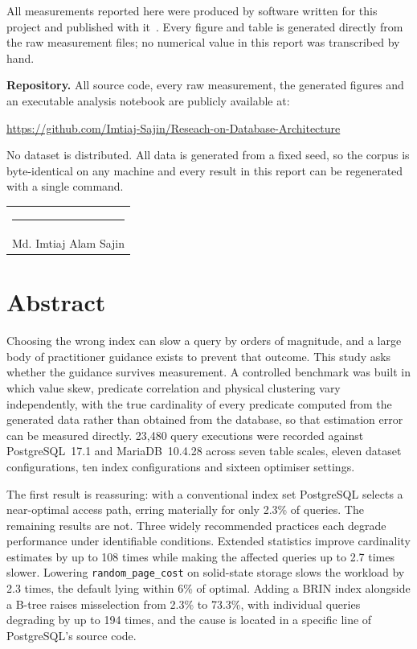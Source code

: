 \documentclass[12pt, a4paper]{article}
\newcommand{\rpc}{\texttt{random\_page\_cost}}
\begin{document}
All measurements reported here were produced by software written for
this project and published with it~\cite{artifact2026}. Every figure and
table is generated directly from the raw measurement files; no numerical
value in this report was transcribed by hand.

\vspace{0.6em}
\noindent
\textbf{Repository.} All source code, every raw measurement, the
generated figures and an executable analysis notebook are publicly
available at:

\vspace{0.3em}
\noindent
\url{https://github.com/Imtiaj-Sajin/Reseach-on-Database-Architecture}

\vspace{0.3em}
\noindent
No dataset is distributed. All data is generated from a fixed seed, so
the corpus is byte-identical on any machine and every result in this
report can be regenerated with a single command.

\vspace{1.2cm}
\noindent
\begin{tabular}{@{}p{6cm}@{}}
    \rule{5cm}{0.4pt} \\
    Md. Imtiaj Alam Sajin \\
\end{tabular}

\newpage

\section*{Abstract}
Choosing the wrong index can slow a query by orders of magnitude, and a
large body of practitioner guidance exists to prevent that outcome. This
study asks whether the guidance survives measurement. A controlled
benchmark was built in which value skew, predicate correlation and
physical clustering vary independently, with the true cardinality of
every predicate computed from the generated data rather than obtained
from the database, so that estimation error can be measured directly.
23{,}480 query executions were recorded against PostgreSQL~17.1 and
MariaDB~10.4.28 across seven table scales, eleven dataset
configurations, ten index configurations and sixteen optimiser settings.

The first result is reassuring: with a conventional index set PostgreSQL
selects a near-optimal access path, erring materially for only 2.3\% of
queries. The remaining results are not. Three widely recommended
practices each degrade performance under identifiable conditions.
Extended statistics improve cardinality estimates by up to 108 times
while making the affected queries up to 2.7 times slower. Lowering
\rpc{} on solid-state storage slows the workload by 2.3 times, the
default lying within 6\% of optimal. Adding a BRIN index alongside a
B-tree raises misselection from 2.3\% to 73.3\%, with individual queries
degrading by up to 194 times, and the cause is located in a specific
line of PostgreSQL's source code.
\end{document}
